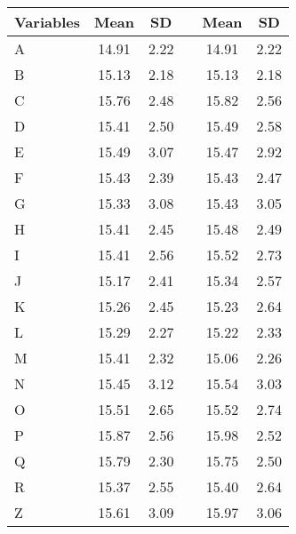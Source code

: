 \begin{tabular}{lccccc}
\toprule
    Variables &  Mean &   SD &  \multicolumn{1}{l}{} &  Mean &   SD \\
\midrule
\hspace{3mm}A & 14.91 & 2.22 &                       & 14.91 & 2.22 \\
\hspace{3mm}B & 15.13 & 2.18 &                       & 15.13 & 2.18 \\
\hspace{3mm}C & 15.76 & 2.48 &                       & 15.82 & 2.56 \\
\hspace{3mm}D & 15.41 & 2.50 &                       & 15.49 & 2.58 \\
\hspace{3mm}E & 15.49 & 3.07 &                       & 15.47 & 2.92 \\
\hspace{3mm}F & 15.43 & 2.39 &                       & 15.43 & 2.47 \\
\hspace{3mm}G & 15.33 & 3.08 &                       & 15.43 & 3.05 \\
\hspace{3mm}H & 15.41 & 2.45 &                       & 15.48 & 2.49 \\
\hspace{3mm}I & 15.41 & 2.56 &                       & 15.52 & 2.73 \\
\hspace{3mm}J & 15.17 & 2.41 &                       & 15.34 & 2.57 \\
\hspace{3mm}K & 15.26 & 2.45 &                       & 15.23 & 2.64 \\
\hspace{3mm}L & 15.29 & 2.27 &                       & 15.22 & 2.33 \\
\hspace{3mm}M & 15.41 & 2.32 &                       & 15.06 & 2.26 \\
\hspace{3mm}N & 15.45 & 3.12 &                       & 15.54 & 3.03 \\
\hspace{3mm}O & 15.51 & 2.65 &                       & 15.52 & 2.74 \\
\hspace{3mm}P & 15.87 & 2.56 &                       & 15.98 & 2.52 \\
\hspace{3mm}Q & 15.79 & 2.30 &                       & 15.75 & 2.50 \\
\hspace{3mm}R & 15.37 & 2.55 &                       & 15.40 & 2.64 \\
\hspace{3mm}Z & 15.61 & 3.09 &                       & 15.97 & 3.06 \\
\bottomrule
\end{tabular}
